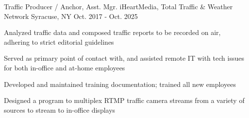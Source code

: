 \begin{cventries}
\vspace{4mm}

\cventry
{Traffic Producer / Anchor, Asst. Mgr.} %
{iHeartMedia, Total Traffic \& Weather Network} %
{Syracuse, NY} %
{Oct. 2017 - Oct. 2025} %
{
\begin{cvitems}
\item {Analyzed traffic data and composed traffic reports to be recorded on air, adhering to strict editorial guidelines}
\item {Served as primary point of contact with, and assisted remote IT with tech issues for both in-office and at-home employees}
\item {Developed and maintained training documentation; trained all new employees}
\item {Designed a program to multiplex RTMP traffic camera streams from a variety of sources to stream to in-office displays}
\end{cvitems}
}

\vspace{4mm}
%
%


\end{cventries}
